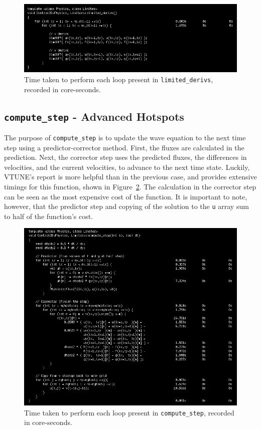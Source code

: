 \documentclass[12pt]{article}
\begin{document}
		\begin{figure}[h!]
			\begin{center}
				\includegraphics[width=0.7\columnwidth]{init_lim_deriv}
				\caption{Time taken to perform each loop present in \texttt{limited\_derivs}, recorded in core-seconds.}
				\label{init_lim_deriv}
			\end{center}
		\end{figure}
		
		\subsection{\texttt{compute\_step} - Advanced Hotspots}
		The purpose of \texttt{compute\_step} is to update the wave equation to the next time step using a predictor-corrector method. First, the fluxes are calculated in the prediction. Next, the corrector step uses the predicted fluxes, the differences in velocities, and the current velocities, to advance to the next time state. Luckily, VTUNE's report is more helpful than in the previous case, and provides extensive timings for this function, shown in Figure~\ref{init_compute_step}. The calculation in the corrector step can be seen as the most expensive cost of the function. It is important to note, however, that the predictor step and copying of the solution to the \texttt{u} array sum to half of the function's cost.
		\begin{figure}[h!]
			\begin{center}
				\includegraphics[width=0.7\columnwidth]{init_compute_step}
				\caption{Time taken to perform each loop present in \texttt{compute\_step}, recorded in core-seconds.}
				\label{init_compute_step}
			\end{center}
		\end{figure}	
		
\end{document}

